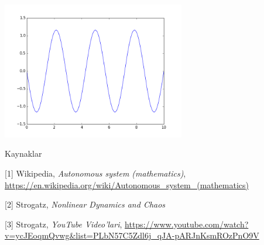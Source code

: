 \documentclass[12pt,fleqn]{article}\usepackage{../../common}
\begin{document}
\includegraphics[height=6cm]{1_10.png}

Kaynaklar

[1] Wikipedia, {\em Autonomous system (mathematics)}, \url{https://en.wikipedia.org/wiki/Autonomous_system_(mathematics)}

[2] Strogatz, {\em Nonlinear Dynamics and Chaos}

[3] Strogatz, {\em YouTube Video'lari}, \url{https://www.youtube.com/watch?v=ycJEoqmQvwg&list=PLbN57C5Zdl6j_qJA-pARJnKsmROzPnO9V}
\end{document}
